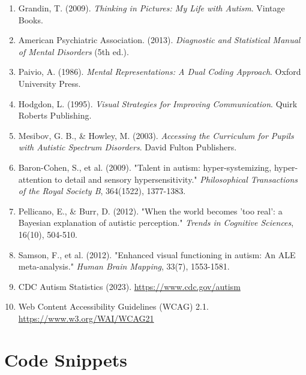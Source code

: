 \documentclass[12pt, a4paper]{article}
\begin{document}
\begin{enumerate}[leftmargin=*, itemsep=10pt]
    \item Grandin, T. (2009). \textit{Thinking in Pictures: My Life with Autism}. Vintage Books.
    
    \item American Psychiatric Association. (2013). \textit{Diagnostic and Statistical Manual of Mental Disorders} (5th ed.).
    
    \item Paivio, A. (1986). \textit{Mental Representations: A Dual Coding Approach}. Oxford University Press.
    
    \item Hodgdon, L. (1995). \textit{Visual Strategies for Improving Communication}. Quirk Roberts Publishing.
    
    \item Mesibov, G. B., \& Howley, M. (2003). \textit{Accessing the Curriculum for Pupils with Autistic Spectrum Disorders}. David Fulton Publishers.
    
    \item Baron-Cohen, S., et al. (2009). "Talent in autism: hyper-systemizing, hyper-attention to detail and sensory hypersensitivity." \textit{Philosophical Transactions of the Royal Society B}, 364(1522), 1377-1383.
    
    \item Pellicano, E., \& Burr, D. (2012). "When the world becomes 'too real': a Bayesian explanation of autistic perception." \textit{Trends in Cognitive Sciences}, 16(10), 504-510.
    
    \item Samson, F., et al. (2012). "Enhanced visual functioning in autism: An ALE meta-analysis." \textit{Human Brain Mapping}, 33(7), 1553-1581.
    
    \item CDC Autism Statistics (2023). \url{https://www.cdc.gov/autism}
    
    \item Web Content Accessibility Guidelines (WCAG) 2.1. \url{https://www.w3.org/WAI/WCAG21}
\end{enumerate}

\newpage
\appendix
\section{Code Snippets}
\end{document}
